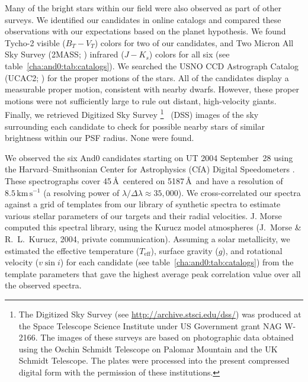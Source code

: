 Many of the bright stars within our field were also observed as part of other surveys. We identified our candidates in online catalogs and compared these observations with our expectations based on the planet hypothesis. We found Tycho-2 \citep{Hog_Fabricius_Makarov:aa:2000b, Hog_Fabricius_Makarov:aa:2000a} visible ($B_{T}-V_{T}$) colors for two of our candidates, and Two Micron All Sky Survey (2MASS; \citealt{Cutri_Skrutskie_van-Dyk:2003a}) infrared ($J-K_{s}$) colors for all six (see table~\ref{cha:and0:tab:catalogs}). We searched the USNO CCD Astrograph Catalog (UCAC2; \citealt{Zacharias_Urban_Zacharias:aj:2004a}) for the proper motions of the stars. All of the candidates display a measurable proper motion, consistent with nearby dwarfs. However, these proper motions were not sufficiently large to rule out distant, high-velocity giants. Finally, we retrieved Digitized Sky Survey%
\footnote{The {Digitized Sky Survey} (see \url{http://archive.stsci.edu/dss/}) was produced at the Space Telescope Science Institute under US Government grant NAG W-2166. The images of these surveys are based on photographic data obtained using the Oschin Schmidt Telescope on Palomar Mountain and the UK Schmidt Telescope. The plates were processed into the present compressed digital form with the permission of these institutions.}%
\ (DSS) images of the sky surrounding each candidate to check for possible nearby stars of similar brightness within our PSF radius. None were found. 

We observed the six And0 candidates starting on UT 2004 September~28 using
the Harvard--Smithsonian Center for Astrophysics (CfA) Digital Speedometers \citep{Latham:ASP:1992a}. These spectrographs cover 45\,\AA\ centered on 5187\,\AA\, and have a resolution of $8.5\,\mathrm{km\,s^{-1}}$ (a resolving power of $\lambda / \Delta \lambda \approx 35,\!000$). We cross-correlated our spectra against a grid of templates from our library of synthetic spectra to estimate various stellar parameters of our targets and their radial velocities. J. Morse computed this spectral library, using the Kurucz model atmospheres (J.~Morse \& R.~L.~Kurucz, 2004, private communication).
Assuming a solar metallicity, we estimated the effective temperature ($T_{\mathrm{eff}}$), surface gravity ($g$), and rotational velocity ($v \sin{i}$) for each candidate (see table~\ref{cha:and0:tab:catalogs}) from the template parameters that gave the highest average peak correlation value over all the observed spectra. 

